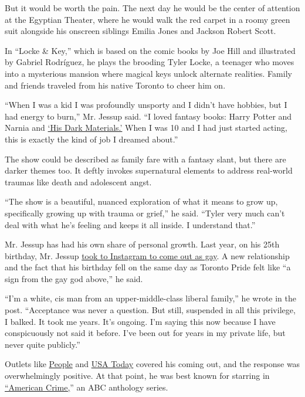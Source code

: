 But it would be worth the pain. The next day he would be the center of
attention at the Egyptian Theater, where he would walk the red carpet in
a roomy green suit alongside his onscreen siblings Emilia Jones and
Jackson Robert Scott.

In ``Locke \& Key,'' which is based on the comic books by Joe Hill and
illustrated by Gabriel Rodríguez, he plays the brooding Tyler Locke, a
teenager who moves into a mysterious mansion where magical keys unlock
alternate realities. Family and friends traveled from his native Toronto
to cheer him on.

``When I was a kid I was profoundly unsporty and I didn't have hobbies,
but I had energy to burn,'' Mr. Jessup said. ``I loved fantasy books:
Harry Potter and Narnia and
\href{https://www.nytimes.com/2019/10/31/arts/television/his-dark-materials-hbo.html}{`His
Dark Materials.'} When I was 10 and I had just started acting, this is
exactly the kind of job I dreamed about.''

The show could be described as family fare with a fantasy slant, but
there are darker themes too. It deftly invokes supernatural elements to
address real-world traumas like death and adolescent angst.

``The show is a beautiful, nuanced exploration of what it means to grow
up, specifically growing up with trauma or grief,'' he said. ``Tyler
very much can't deal with what he's feeling and keeps it all inside. I
understand that.''

Mr. Jessup has had his own share of personal growth. Last year, on his
25th birthday, Mr. Jessup
\href{https://www.instagram.com/p/BzE6A9llBf2/}{took to Instagram to
come out as gay}. A new relationship and the fact that his birthday fell
on the same day as Toronto Pride felt like ``a sign from the gay god
above,'' he said.

``I'm a white, cis man from an upper-middle-class liberal family,'' he
wrote in the post. ``Acceptance was never a question. But still,
suspended in all this privilege, I balked. It took me years. It's
ongoing. I'm saying this now because I have conspicuously not said it
before. I've been out for years in my private life, but never quite
publicly.''

Outlets like
\href{https://people.com/tv/american-crime-connor-jessup-comes-out-gay/}{People}
and
\href{https://www.usatoday.com/story/life/people/2019/06/25/american-crime-actor-connor-jessup-comes-out-gay/1566558001/}{USA
Today} covered his coming out, and the response was overwhelmingly
positive. At that point, he was best known for starring in
\href{https://www.nytimes.com/watching/recommendations/american-crime}{``American
Crime,}'' an ABC anthology series.

